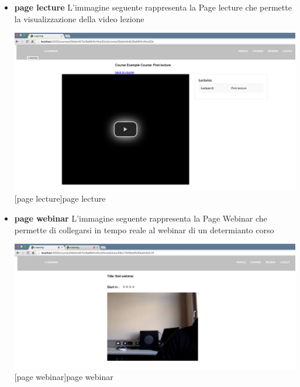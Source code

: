 \begin{itemize}
\item \textbf{page lecture} L'immagine seguente rappresenta la Page lecture che permette la visualizzazione della video lezione\par

\begin{minipage}{\linewidth}
    \centering
    \includegraphics[width=1.0\linewidth]{images/chapter4/page-lecture.png}
    [page lecture]{page lecture}
\end{minipage}


\item \textbf{page webinar} L'immagine seguente rappresenta la Page Webinar che permette di collegarsi in tempo reale al webinar di un determianto corso\par
\begin{minipage}{\linewidth}
    \centering
    \includegraphics[width=1.0\linewidth]{images/chapter4/page-webinar.png}
    [page webinar]{page webinar}
\end{minipage}

\end{itemize}
